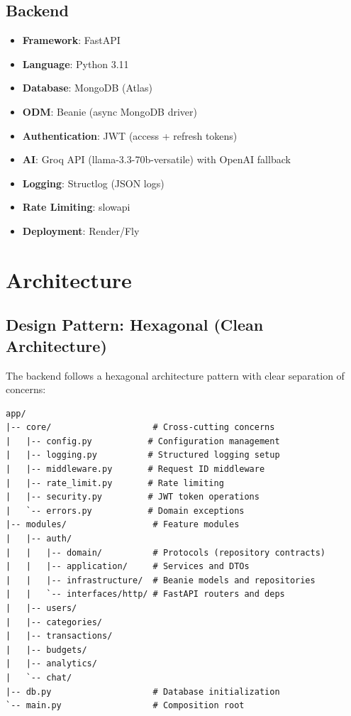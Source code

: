 \documentclass[11pt,a4paper]{article}
\begin{document}
\subsection{Backend}
\begin{itemize}[leftmargin=*,itemsep=2pt]
  \item \textbf{Framework}: FastAPI
  \item \textbf{Language}: Python 3.11
  \item \textbf{Database}: MongoDB (Atlas)
  \item \textbf{ODM}: Beanie (async MongoDB driver)
  \item \textbf{Authentication}: JWT (access + refresh tokens)
  \item \textbf{AI}: Groq API (llama-3.3-70b-versatile) with OpenAI fallback
  \item \textbf{Logging}: Structlog (JSON logs)
  \item \textbf{Rate Limiting}: slowapi
  \item \textbf{Deployment}: Render/Fly
\end{itemize}

\section{Architecture}

\subsection{Design Pattern: Hexagonal (Clean Architecture)}

The backend follows a hexagonal architecture pattern with clear separation of concerns:

\begin{lstlisting}
app/
|-- core/                    # Cross-cutting concerns
|   |-- config.py           # Configuration management
|   |-- logging.py          # Structured logging setup
|   |-- middleware.py       # Request ID middleware
|   |-- rate_limit.py       # Rate limiting
|   |-- security.py         # JWT token operations
|   `-- errors.py           # Domain exceptions
|-- modules/                 # Feature modules
|   |-- auth/
|   |   |-- domain/          # Protocols (repository contracts)
|   |   |-- application/     # Services and DTOs
|   |   |-- infrastructure/  # Beanie models and repositories
|   |   `-- interfaces/http/ # FastAPI routers and deps
|   |-- users/
|   |-- categories/
|   |-- transactions/
|   |-- budgets/
|   |-- analytics/
|   `-- chat/
|-- db.py                    # Database initialization
`-- main.py                  # Composition root
\end{lstlisting}
\end{document}
